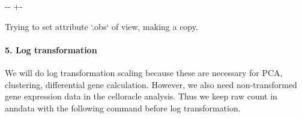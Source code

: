 \documentclass[letterpaper,10pt,english]{sphinxmanual}
\newlength\nbsphinxcodecellspacing
\begin{document}
{
%
\begin{sphinxVerbatim}[commandchars=\\\{\}]
\llap{\color{nbsphinxin}[6]:\,\hspace{\fboxrule}\hspace{\fboxsep}}
  

  \PYG{p}{[} \PYG{p}{]}

\end{sphinxVerbatim}
}



%
{
\kern-\sphinxverbatimsmallskipamount\kern-\baselineskip
\kern+\FrameHeightAdjust\kern-\fboxrule
\vspace{\nbsphinxcodecellspacing}
%
\begin{sphinxVerbatim}[commandchars=\\\{\}]
Trying to set attribute `.obs` of view, making a copy.
\end{sphinxVerbatim}
}
\relax


\paragraph{5. Log transformation}
\label{\detokenize{notebooks/03_scRNA-seq_data_preprocessing/scanpy_preprocessing_with_Paul_etal_2015_data:5.-Log-transformation}}
We will do log transformation scaling because these are necessary for PCA, clustering, differential gene calculation. However, we also need non-transformed gene expression data in the celloracle analysis. Thus we keep raw count in anndata with the following command before log transformation.
\end{document}
